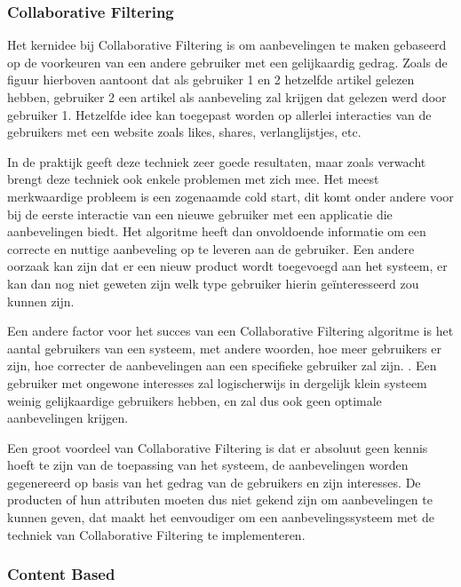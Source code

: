 \subsubsection{Collaborative Filtering}
\label{sec:Collaborative Filtering}

Het kernidee bij Collaborative Filtering \autocite{Schafera} is om aanbevelingen te maken gebaseerd op de voorkeuren van een andere gebruiker met een gelijkaardig gedrag. Zoals de figuur hierboven aantoont dat als gebruiker 1 en 2 hetzelfde artikel gelezen hebben, gebruiker 2 een artikel als aanbeveling zal krijgen dat gelezen werd door gebruiker 1. 
Hetzelfde idee kan toegepast worden op allerlei interacties van de gebruikers met een website zoals likes, shares, verlanglijstjes, etc.

In de praktijk geeft deze techniek zeer goede resultaten, maar zoals verwacht brengt deze techniek ook enkele problemen met zich mee. Het meest merkwaardige probleem is een zogenaamde cold start, dit komt onder andere voor bij de eerste interactie van een nieuwe gebruiker met een applicatie die aanbevelingen biedt. Het algoritme heeft dan onvoldoende informatie om een correcte en nuttige aanbeveling op te leveren aan de gebruiker. Een andere oorzaak kan zijn dat er een nieuw product wordt toegevoegd aan het systeem, er kan dan nog niet geweten zijn welk type gebruiker hierin geïnteresseerd zou kunnen zijn. 

Een andere factor voor het succes van een Collaborative Filtering algoritme is het aantal gebruikers van een systeem, met andere woorden, hoe meer gebruikers er zijn, hoe correcter de aanbevelingen aan een specifieke gebruiker zal zijn. \autocite{Sarwar2001}. Een gebruiker met ongewone interesses zal logischerwijs in dergelijk klein systeem weinig gelijkaardige gebruikers hebben, en zal dus ook geen optimale aanbevelingen krijgen.


Een groot voordeel van Collaborative Filtering is dat er absoluut geen kennis hoeft te zijn van de toepassing van het systeem, de aanbevelingen worden gegenereerd op basis van het gedrag van de gebruikers en zijn interesses. De producten of hun attributen moeten dus niet gekend zijn om aanbevelingen te kunnen geven, dat maakt het eenvoudiger om een aanbevelingssysteem met de techniek van Collaborative Filtering te implementeren.

\subsubsection{Content Based}
\label{sec:Content Based}

